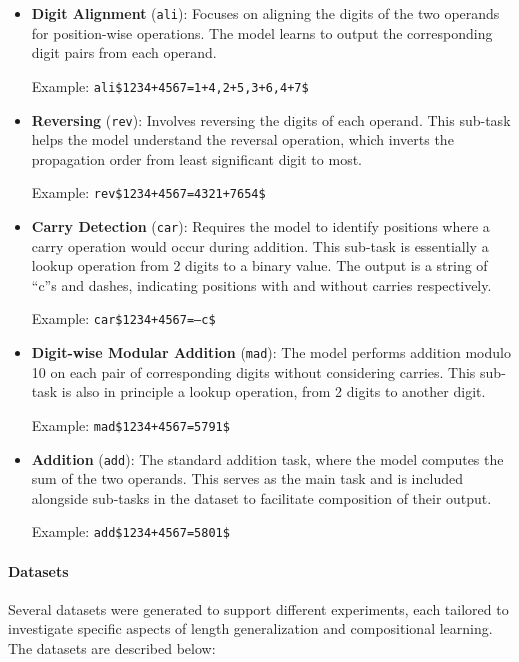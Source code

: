 \begin{itemize}
  \item \textbf{Digit Alignment} (\texttt{ali}): Focuses on aligning the digits of the two operands for position-wise operations. The model learns to output the corresponding digit pairs from each operand.

        Example: \texttt{ali\$1234+4567=1+4,2+5,3+6,4+7\$}

  \item \textbf{Reversing} (\texttt{rev}): Involves reversing the digits of each operand. This sub-task helps the model understand the reversal operation, which inverts the propagation order from least significant digit to most.

        Example: \texttt{rev\$1234+4567=4321+7654\$}

  \item \textbf{Carry Detection} (\texttt{car}): Requires the model to identify positions where a carry operation would occur during addition. This sub-task is essentially a lookup operation from 2 digits to a binary value. The output is a string of ``c''s and dashes, indicating positions with and without carries respectively.

        Example: \texttt{car\$1234+4567=---c\$}

  \item \textbf{Digit-wise Modular Addition} (\texttt{mad}): The model performs addition modulo 10 on each pair of corresponding digits without considering carries. This sub-task is also in principle a lookup operation, from 2 digits to another digit.

        Example: \texttt{mad\$1234+4567=5791\$}

  \item \textbf{Addition} (\texttt{add}): The standard addition task, where the model computes the sum of the two operands. This serves as the main task and is included alongside sub-tasks in the dataset to facilitate composition of their output.

        Example: \texttt{add\$1234+4567=5801\$}
\end{itemize}

\paragraph{Datasets}

Several datasets were generated to support different experiments, each tailored to investigate specific aspects of length generalization and compositional learning. The datasets are described below:

